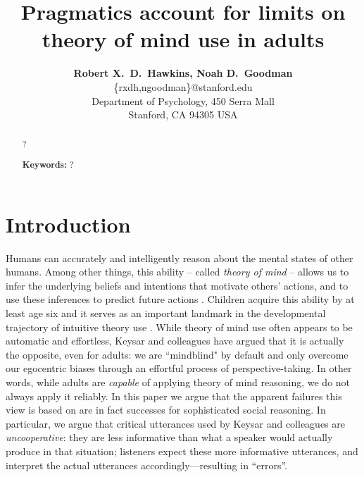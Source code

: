 \documentclass[10pt,letterpaper]{article}
\title{Pragmatics account for limits on theory of mind use in adults}
\author{{\large \bf Robert X.~D.~Hawkins, Noah D.~Goodman}\\
  \{rxdh,ngoodman\}@stanford.edu\\
  Department of Psychology, 450 Serra Mall \\
  Stanford, CA 94305 USA}
\begin{document}
\maketitle

\begin{abstract}
?

\textbf{Keywords:} 
?
\end{abstract}

\section{Introduction}
\label{sec:intro}

Humans can accurately and intelligently reason about the mental states of other humans. Among other things, this ability -- called \emph{theory of mind} \cite{PremackWoodruff78_ChimpanzeeToM} -- allows us to infer the underlying beliefs and intentions that motivate others' actions, and to use these inferences to predict future actions \cite{BakerSaxeTenenbaum09_ActionUnderstandingInversePlanning}. Children acquire this ability by at least age six \cite{WimmerPerner83_BeliefsAboutBeliefs, WellmanCrossWatson01_ToMMetaAnalysis} and it serves as an important landmark in the developmental trajectory of intuitive theory use \cite{GopnikWellman12_ReconstructingConstructivism}.
%
While theory of mind use often appears to be automatic and effortless, Keysar and colleagues \cite{KeysarBarr___Brauner00_TakingPerspective, KeysarLinBarr03_LimitsOnTheoryOfMindUse, LinKeysarEpley10_ReflexivelyMindblind} have argued that it is actually the opposite, even for adults: we are ``mindblind" by default and only overcome our egocentric biases through an effortful process of perspective-taking. In other words, while adults are \emph{capable} of applying theory of mind reasoning, we do not always apply it reliably. 
In this paper we argue that the apparent failures this view is based on are in fact successes for sophisticated social reasoning. 
In particular, we argue that critical utterances used by Keysar and colleagues are \emph{uncooperative}: they are less informative than what a speaker would actually produce in that situation; listeners expect these more informative utterances, and interpret the actual utterances accordingly---resulting in ``errors''.
\end{document}
